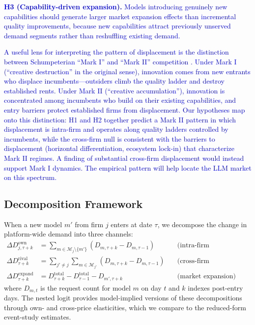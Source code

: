 \documentclass[11pt, a4paper]{article}
\begin{document}
\medskip
\noindent \textcolor{blue}{\textbf{H3 (Capability-driven expansion).} Models introducing genuinely new capabilities should generate larger market expansion effects than incremental quality improvements, because new capabilities attract previously unserved demand segments rather than reshuffling existing demand.}

\textcolor{blue}{A useful lens for interpreting the pattern of displacement is the distinction between Schumpeterian ``Mark I'' and ``Mark II'' competition \citep{aghion1992model, aghion2005competition}. Under Mark I (``creative destruction'' in the original sense), innovation comes from new entrants who displace incumbents---outsiders climb the quality ladder and destroy established rents. Under Mark II (``creative accumulation''), innovation is concentrated among incumbents who build on their existing capabilities, and entry barriers protect established firms from displacement. Our hypotheses map onto this distinction: H1 and H2 together predict a Mark II pattern in which displacement is intra-firm and operates along quality ladders controlled by incumbents, while the cross-firm null is consistent with the barriers to displacement (horizontal differentiation, ecosystem lock-in) that characterize Mark II regimes. A finding of substantial cross-firm displacement would instead support Mark I dynamics. The empirical pattern will help locate the LLM market on this spectrum.}

\subsection{Decomposition Framework}

When a new model $m'$ from firm $j$ enters at date $\tau$, we decompose the change in platform-wide demand into three channels:
\begin{align}
\Delta D^{\text{own}}_{j,\tau+k} &= \sum_{m \in \mathcal{M}_j \setminus \{m'\}} \left( D_{m,\tau+k} - D_{m,\tau-1} \right) \quad &\text{(intra-firm cannibalization)} \label{eq:own} \\
\Delta D^{\text{rival}}_{\tau+k} &= \sum_{j' \neq j} \sum_{m \in \mathcal{M}_{j'}} \left( D_{m,\tau+k} - D_{m,\tau-1} \right) \quad &\text{(cross-firm displacement)} \label{eq:rival} \\
\Delta D^{\text{expand}}_{\tau+k} &= D^{\text{total}}_{\tau+k} - D^{\text{total}}_{\tau-1} - D_{m',\tau+k} \quad &\text{(market expansion)} \label{eq:expand}
\end{align}
where $D_{m,t}$ is the request count for model $m$ on day $t$ and $k$ indexes post-entry days. The nested logit provides model-implied versions of these decompositions through own- and cross-price elasticities, which we compare to the reduced-form event-study estimates.
\end{document}
